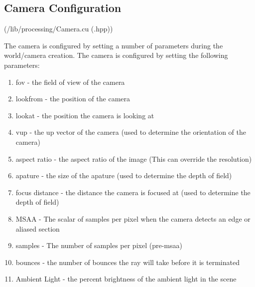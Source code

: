 \documentclass{article}
\begin{document}
    \subsection{Camera Configuration}
    (/lib/processing/Camera.cu (.hpp))\par
    The camera is configured by setting a number of parameters during the world/camera creation. The camera is configured by setting the following parameters: \par
    \begin{enumerate}
        \item fov - the field of view of the camera
        \item lookfrom - the position of the camera
        \item lookat - the position the camera is looking at
        \item vup - the up vector of the camera (used to determine the orientation of the camera)
        \item aspect ratio - the aspect ratio of the image (This can override the resolution)
        \item apature - the size of the apature (used to determine the depth of field)
        \item focus distance - the distance the camera is focused at (used to determine the depth of field)
        \item MSAA - The scalar of samples per pixel when the camera detects an edge or aliased section 
        \item samples - The number of samples per pixel (pre-msaa)
        \item bounces - the number of bounces the ray will take before it is terminated
        \item Ambient Light - the percent brightness of the ambient light in the scene 
    \end{enumerate}
\end{document}
